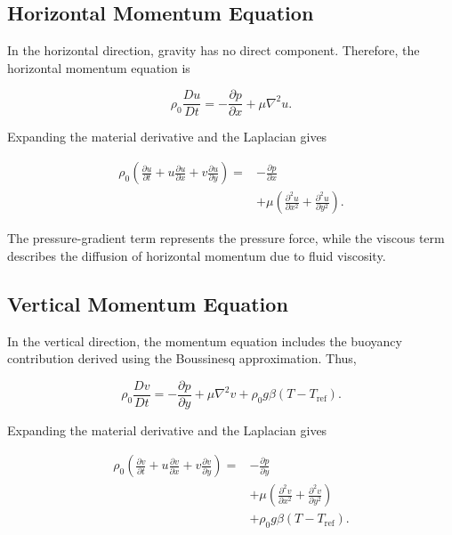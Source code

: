 \documentclass{article}
\begin{document}
\subsection{Horizontal Momentum Equation}

In the horizontal direction, gravity has no direct component.
Therefore, the horizontal momentum equation is

\begin{equation}
\rho_0\frac{Du}{Dt}
=-\frac{\partial p}{\partial x}
+\mu\nabla^2u.
\end{equation}

Expanding the material derivative and the Laplacian gives

\begin{equation}
\boxed{
\begin{aligned}
\rho_0\left(
\frac{\partial u}{\partial t}
+u\frac{\partial u}{\partial x}
+v\frac{\partial u}{\partial y}
\right)
={}&-\frac{\partial p}{\partial x}\\
&+\mu\left(
\frac{\partial^2u}{\partial x^2}
+\frac{\partial^2u}{\partial y^2}
\right).
\end{aligned}
}
\label{eq:xmomentum}
\end{equation}

The pressure-gradient term represents the pressure force,
while the viscous term describes the diffusion of horizontal
momentum due to fluid viscosity.

\subsection{Vertical Momentum Equation}

In the vertical direction, the momentum equation includes
the buoyancy contribution derived using the Boussinesq
approximation. Thus,

\begin{equation}
\rho_0\frac{Dv}{Dt}
=-\frac{\partial p}{\partial y}
+\mu\nabla^2v
+\rho_0g\beta(T-T_{\mathrm{ref}}).
\end{equation}

Expanding the material derivative and the Laplacian gives

\begin{equation}
\boxed{
\begin{aligned}
\rho_0\left(
\frac{\partial v}{\partial t}
+u\frac{\partial v}{\partial x}
+v\frac{\partial v}{\partial y}
\right)
={}&-\frac{\partial p}{\partial y}\\
&+\mu\left(
\frac{\partial^2v}{\partial x^2}
+\frac{\partial^2v}{\partial y^2}
\right)\\
&+\rho_0g\beta(T-T_{\mathrm{ref}}).
\end{aligned}
}
\label{eq:ymomentum}
\end{equation}
\end{document}
